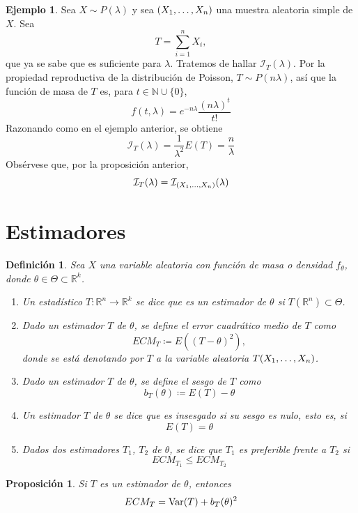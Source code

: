 \documentclass[11pt]{report}
\newtheorem{proposition}{Proposición}
\newtheorem{definition}{Definición}
\theoremstyle{definition}
\newtheorem{example}{Ejemplo}
\newcommand{\R}{\mathbb R}
\newcommand{\N}{\mathbb N}
\begin{document}
\begin{example}
Sea $X \sim P(\lambda)$ y sea $(X_1,\mathellipsis,X_n)$ una muestra aleatoria simple de $X$. Sea
\[T=\sum_{i=1}^nX_i,\]
que ya se sabe que es suficiente para $\lambda$. Tratemos de hallar $\mathcal{I}_T(\lambda)$. Por la propiedad reproductiva de la distribución de Poisson, $T \sim P(n\lambda)$, así que la función de masa de $T$ es, para $t \in \N \cup \{0\}$,
\[f(t,\lambda) = e^{-n\lambda}\frac{(n\lambda)^t}{t!}\]
Razonando como en el ejemplo anterior, se obtiene
\[\mathcal{I}_T(\lambda) = \frac{1}{\lambda^2}E(T) = \frac{n}{\lambda}\]
Obsérvese que, por la proposición anterior,
\[\mathcal{I}_T(\lambda) =\mathcal{I}_{(X_1,\mathellipsis,X_n)}(\lambda)\]
\end{example}

\section{Estimadores}

\begin{definition}
Sea $X$ una variable aleatoria con función de masa o densidad $f_\theta$, donde $\theta\in\Theta\subset\R^k$. 
\begin{enumerate}
    \item Un estadístico $T \colon \R^n \to \R^k$ se dice que es un \emph{estimador de $\theta$} si $T(\R^n) \subset \Theta$.
    \item Dado un estimador $T$ de $\theta$, se define el \emph{error cuadrático medio de $T$} como
    \[ECM_T\coloneqq E\left((T-\theta)^2\right),\]
    donde se está denotando por $T$ a la variable aleatoria $T(X_1,\mathellipsis,X_n)$.
    \item Dado un estimador $T$ de $\theta$, se define el \emph{sesgo de $T$} como
    \[b_T(\theta)\coloneqq E(T)-\theta\]
    \item Un estimador $T$ de $\theta$ se dice que es \emph{insesgado} si su sesgo es nulo, esto es, si 
    \[E(T) = \theta\]
    \item Dados dos estimadores $T_1$, $T_2$ de $\theta$, se dice que \emph{$T_1$ es preferible frente a $T_2$} si \[ECM_{T_1}\leq ECM_{T_2}\]
\end{enumerate}
\end{definition}

\begin{proposition}
Si $T$ es un estimador de $\theta$, entonces
\[ECM_T = \textup{Var}(T)+b_T(\theta)^2\]
\end{proposition}
\end{document}

